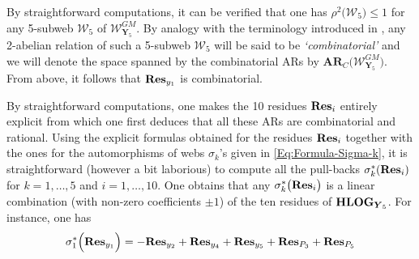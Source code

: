 \documentclass[11pt]{amsart}
\newcommand{\mk}{\medskip}
\begin{document}
By straightforward computations, it can be verified that 
one has $\rho^2\big( \boldsymbol{\mathcal W}_5\big) \leq 1$ 
for any 5-subweb 
$\boldsymbol{\mathcal W}_5$ of 
$\boldsymbol{\mathcal W}_{\boldsymbol{Y}_5}^{GM}$.  By analogy with the terminology introduced in \cite{Damiano}, any 2-abelian relation of such a 5-subweb  
$\boldsymbol{\mathcal W}_5$ will be said to be {\it `combinatorial'} and we will denote the space spanned by the combinatorial ARs by $\boldsymbol{AR}_C\big(\boldsymbol{\mathcal W}_{\boldsymbol{Y}_5}^{GM}\big)$. From above, it follows that ${\bf Res}_{y_1}$ is combinatorial. 
\mk 

By straightforward computations, one makes the 10 residues 
 ${\bf Res}_{i}$ entirely explicit from which one first deduces that all these ARs are combinatorial and rational. Using the  explicit formulas obtained for the residues ${\bf Res}_{i}$ together with the ones for the automorphisms of webs 
$\sigma_k$'s given in \eqref{Eq:Formula-Sigma-k}, it is straightforward (however a bit laborious) to compute all the pull-backs $\sigma_k^*({\bf Res}_{i})$ for 
$k=1,\ldots,5$ and  $i=1,\ldots,10$. One obtains that any $\sigma_k^*\big( {\bf Res}_{i}\big)$ is a linear combination (with non-zero coefficients $\pm 1$) of the ten residues of ${\bf HLOG}_{ \boldsymbol{Y}_5}$. For instance, one has 
%
%
$$
\sigma_1^*\Big( {\bf Res}_{y_1}
 \Big)
=-{\bf Res}_{y_2}+{\bf Res}_{y_4}+{\bf Res}_{y_5}+{\bf Res}_{P_3}+{\bf Res}_{P_{5}}
$$
\end{document}
